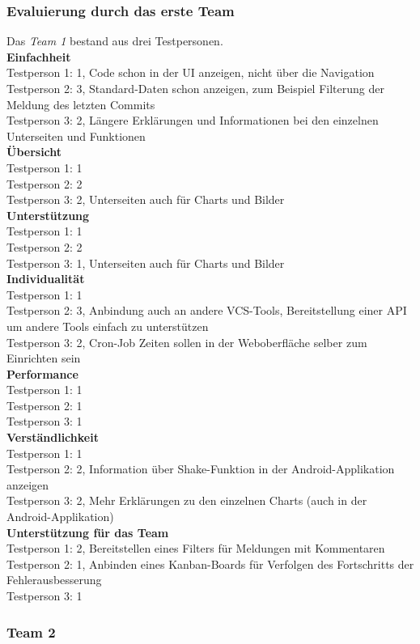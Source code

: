 \subsubsection{Evaluierung durch das erste Team}
Das \textit{Team 1} bestand aus drei Testpersonen. \\
\textbf{Einfachheit} \\
Testperson 1: 1, Code schon in der UI anzeigen, nicht über die Navigation \\
Testperson 2: 3, Standard-Daten schon anzeigen, zum Beispiel Filterung der Meldung des letzten Commits \\
Testperson 3: 2, Längere Erklärungen und Informationen bei den einzelnen Unterseiten und Funktionen \\
\textbf{Übersicht} \\
Testperson 1: 1 \\
Testperson 2: 2 \\
Testperson 3: 2, Unterseiten auch für Charts und Bilder \\
\textbf{Unterstützung} \\
Testperson 1: 1 \\
Testperson 2: 2 \\
Testperson 3: 1, Unterseiten auch für Charts und Bilder \\
\textbf{Individualität} \\
Testperson 1: 1 \\
Testperson 2: 3, Anbindung auch an andere VCS-Tools, Bereitstellung einer API um andere Tools einfach zu unterstützen \\
Testperson 3: 2, Cron-Job Zeiten sollen in der Weboberfläche selber zum Einrichten sein\\
\textbf{Performance} \\
Testperson 1: 1 \\
Testperson 2: 1 \\
Testperson 3: 1 \\
\textbf{Verständlichkeit} \\
Testperson 1: 1 \\
Testperson 2: 2, Information über Shake-Funktion in der Android-Applikation anzeigen \\
Testperson 3: 2, Mehr Erklärungen zu den einzelnen Charts (auch in der Android-Applikation) \\
\textbf{Unterstützung für das Team} \\
Testperson 1: 2, Bereitstellen eines Filters für Meldungen mit Kommentaren \\
Testperson 2: 1, Anbinden eines Kanban-Boards für Verfolgen des Fortschritts der Fehlerausbesserung \\
Testperson 3: 1 \\
\subsubsection{Team 2}
\chapterend
